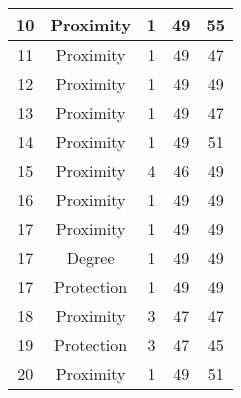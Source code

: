 \documentclass[results.tex]{subfiles}
\begin{document}
\begin{center}
\begin{tabular}{| c || c | c | c | c |}
            \hline
            10                      & Proximity                    & 1                      & 49                      & 55                   \\
            \hline
            11                      & Proximity                    & 1                      & 49                      & 47                   \\
            \hline
            12                      & Proximity                    & 1                      & 49                      & 49                   \\
            \hline
            13                      & Proximity                    & 1                      & 49                      & 47                   \\
            \hline
            14                      & Proximity                    & 1                      & 49                      & 51                   \\
            \hline
            15                      & Proximity                    & 4                      & 46                      & 49                   \\
            \hline
            16                      & Proximity                    & 1                      & 49                      & 49                   \\
            \hline
            17                      & Proximity                    & 1                      & 49                      & 49                   \\
            \hline
            17                      & Degree                       & 1                      & 49                      & 49                   \\
            \hline
            17                      & Protection                   & 1                      & 49                      & 49                   \\
            \hline
            18                      & Proximity                    & 3                      & 47                      & 47                   \\
            \hline
            19                      & Protection                   & 3                      & 47                      & 45                   \\
            \hline
            20                      & Proximity                    & 1                      & 49                      & 51                   \\

\end{tabular}
\end{center}
\end{document}
